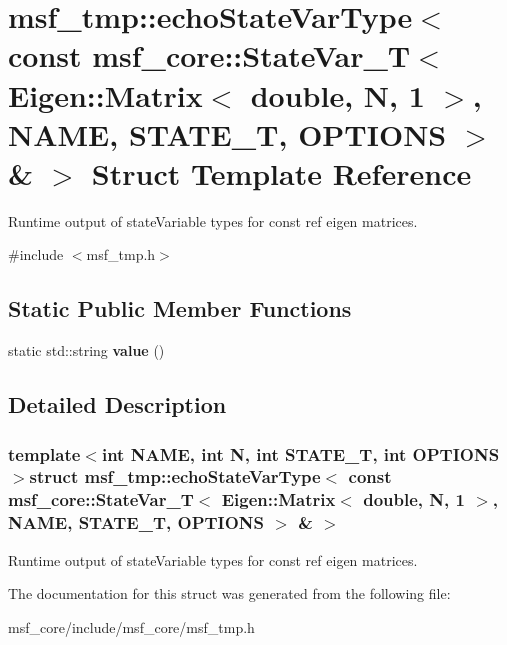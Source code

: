 \hypertarget{structmsf__tmp_1_1echoStateVarType_3_01const_01msf__core_1_1StateVar__T_3_01Eigen_1_1Matrix_3_01f7a55ffb559c20f31cb06a2ee67f7cdd}{\section{msf\-\_\-tmp\-:\-:echo\-State\-Var\-Type$<$ const msf\-\_\-core\-:\-:State\-Var\-\_\-\-T$<$ Eigen\-:\-:Matrix$<$ double, N, 1 $>$, N\-A\-M\-E, S\-T\-A\-T\-E\-\_\-\-T, O\-P\-T\-I\-O\-N\-S $>$ \& $>$ Struct Template Reference}
\label{structmsf__tmp_1_1echoStateVarType_3_01const_01msf__core_1_1StateVar__T_3_01Eigen_1_1Matrix_3_01f7a55ffb559c20f31cb06a2ee67f7cdd}
}


Runtime output of state\-Variable types for const ref eigen matrices.  




{\ttfamily \#include $<$msf\-\_\-tmp.\-h$>$}

\subsection*{Static Public Member Functions}
\begin{DoxyCompactItemize}
\item 
\hypertarget{structmsf__tmp_1_1echoStateVarType_3_01const_01msf__core_1_1StateVar__T_3_01Eigen_1_1Matrix_3_01f7a55ffb559c20f31cb06a2ee67f7cdd_a5998e24a4a99711f4e462660e17b669a}{static std\-::string {\bfseries value} ()}\label{structmsf__tmp_1_1echoStateVarType_3_01const_01msf__core_1_1StateVar__T_3_01Eigen_1_1Matrix_3_01f7a55ffb559c20f31cb06a2ee67f7cdd_a5998e24a4a99711f4e462660e17b669a}

\end{DoxyCompactItemize}


\subsection{Detailed Description}
\subsubsection*{template$<$int N\-A\-M\-E, int N, int S\-T\-A\-T\-E\-\_\-\-T, int O\-P\-T\-I\-O\-N\-S$>$struct msf\-\_\-tmp\-::echo\-State\-Var\-Type$<$ const msf\-\_\-core\-::\-State\-Var\-\_\-\-T$<$ Eigen\-::\-Matrix$<$ double, N, 1 $>$, N\-A\-M\-E, S\-T\-A\-T\-E\-\_\-\-T, O\-P\-T\-I\-O\-N\-S $>$ \& $>$}

Runtime output of state\-Variable types for const ref eigen matrices. 

The documentation for this struct was generated from the following file\-:\begin{DoxyCompactItemize}
\item 
msf\-\_\-core/include/msf\-\_\-core/msf\-\_\-tmp.\-h\end{DoxyCompactItemize}

